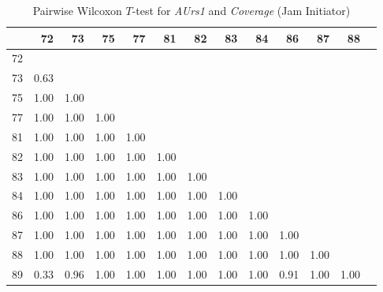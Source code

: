     \begin{table}[ht!]
        \small
        \centering
        \begin{tabular}{rrrrrrrrrrrrr}
            \toprule
               & 72 & 73 & 75 & 77 & 81 & 82 & 83 & 84 & 86 & 87 & 88 \\ 
            \midrule
            72 &  &  &  &  &  &  &  &  &  &  &  \\ 
            73 & 0.63 &  &  &  &  &  &  &  &  &  &  \\ 
            75 & 1.00 & 1.00 &  &  &  &  &  &  &  &  &  \\ 
            77 & 1.00 & 1.00 & 1.00 &  &  &  &  &  &  &  &  \\ 
            81 & 1.00 & 1.00 & 1.00 & 1.00 &  &  &  &  &  &  &  \\ 
            82 & 1.00 & 1.00 & 1.00 & 1.00 & 1.00 &  &  &  &  &  &  \\ 
            83 & 1.00 & 1.00 & 1.00 & 1.00 & 1.00 & 1.00 &  &  &  &  &  \\ 
            84 & 1.00 & 1.00 & 1.00 & 1.00 & 1.00 & 1.00 & 1.00 &  &  &  &  \\ 
            86 & 1.00 & 1.00 & 1.00 & 1.00 & 1.00 & 1.00 & 1.00 & 1.00 &  &  &  \\ 
            87 & 1.00 & 1.00 & 1.00 & 1.00 & 1.00 & 1.00 & 1.00 & 1.00 & 1.00 &  &  \\ 
            88 & 1.00 & 1.00 & 1.00 & 1.00 & 1.00 & 1.00 & 1.00 & 1.00 & 1.00 & 1.00 &  \\ 
            89 & 0.33 & 0.96 & 1.00 & 1.00 & 1.00 & 1.00 & 1.00 & 1.00 & 0.91 & 1.00 & 1.00 \\ 
            \bottomrule
        \end{tabular}
        \caption{Pairwise Wilcoxon $T$-test for \textit{AUrs1} and \textit{Coverage} (Jam Initiator)}
        \label{tbl:wilcoxon_baysis_initiator_AUrs1_Cov}
    \end{table}

